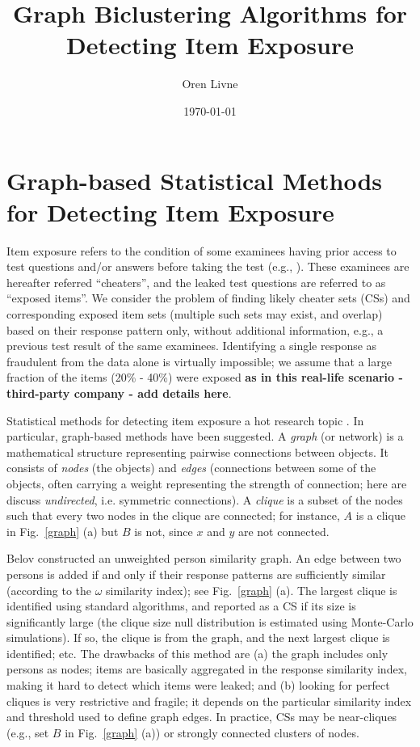 \documentclass{article}
\title{Graph Biclustering Algorithms for Detecting Item Exposure}
\author[1]{Oren Livne}
\affil[1]{Educational Testing Service, 660 Rosedale Road, Attn: MS-12, T-197, Princeton, NJ 08540. Email: olivne@ets.org}
\date{\today}
\begin{document}
\maketitle

\section{Graph-based Statistical Methods for Detecting Item Exposure}
Item exposure refers to the condition of some examinees having prior access to test questions and/or answers before taking the test (e.g., \cite{eckerly}). These examinees are hereafter referred ``cheaters'', and the leaked test questions are referred to as ``exposed items''. We consider the problem of finding likely cheater sets (CSs) and corresponding exposed item sets (multiple such sets may exist, and overlap) based on their response pattern only, without additional information, e.g., a previous test result of the same examinees. Identifying a single response as fraudulent from the data alone is virtually impossible; we assume that a large fraction of the items (20\% - 40\%) were exposed {\bf as in this real-life scenario - third-party company - add details here}.

Statistical methods for detecting item exposure a hot research topic \cite{test_fraud_book}. In particular, graph-based methods have been suggested. A {\it graph} (or network) is a mathematical structure representing pairwise connections between objects. It consists of {\it nodes} (the objects) and {\it edges} (connections between some of the objects, often carrying a weight representing the strength of connection; here are discuss {\it undirected}, i.e. symmetric connections). A {\it clique} is a subset of the nodes such that every two nodes in the clique are connected; for instance, $A$ is a clique in Fig.~\ref{graph} (a) but $B$ is not, since $x$ and $y$ are not connected.
 
Belov \cite{belov} constructed an unweighted person similarity graph. An edge between two persons is added if and only if their response patterns are sufficiently similar (according to the $\omega$ similarity index); see Fig.~\ref{graph} (a). The largest clique is identified using standard algorithms, and reported as a CS if its size is significantly large (the clique size null distribution is estimated using Monte-Carlo simulations). If so, the clique is from the graph, and the next largest clique is identified; etc. The drawbacks of this method are (a) the graph includes only persons as nodes; items are basically aggregated in the response similarity index, making it hard to detect which items were leaked; and (b) looking for perfect cliques is very restrictive and fragile; it depends on the particular similarity index and threshold used to define graph edges. In practice, CSs may be near-cliques (e.g., set $B$ in Fig.~\ref{graph} (a)) or strongly connected clusters of nodes.
\end{document}
